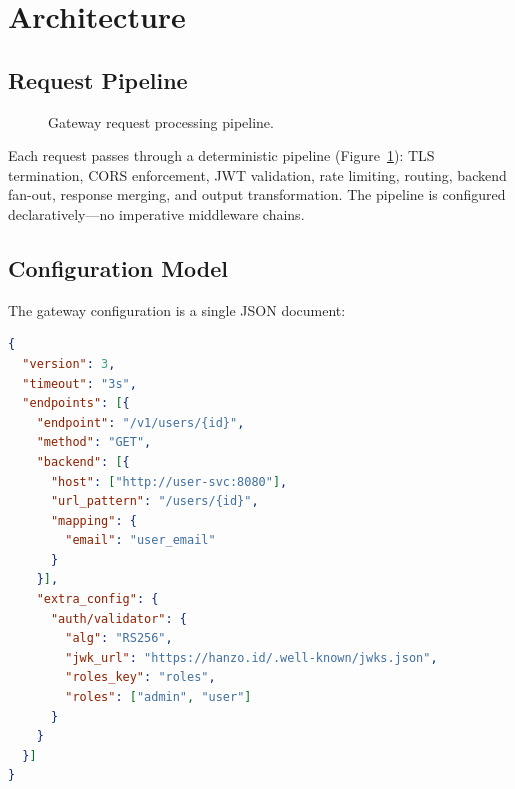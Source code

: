 \documentclass[11pt,twocolumn]{article}
\begin{document}
\section{Architecture}

\subsection{Request Pipeline}

\begin{figure}[t]
\centering
{}
\caption{Gateway request processing pipeline.}
\label{fig:pipeline}
\end{figure}

Each request passes through a deterministic pipeline (Figure~\ref{fig:pipeline}): TLS termination, CORS enforcement, JWT validation, rate limiting, routing, backend fan-out, response merging, and output transformation. The pipeline is configured declaratively---no imperative middleware chains.

\subsection{Configuration Model}

The gateway configuration is a single JSON document:

\begin{lstlisting}[language=JSON]
{
  "version": 3,
  "timeout": "3s",
  "endpoints": [{
    "endpoint": "/v1/users/{id}",
    "method": "GET",
    "backend": [{
      "host": ["http://user-svc:8080"],
      "url_pattern": "/users/{id}",
      "mapping": {
        "email": "user_email"
      }
    }],
    "extra_config": {
      "auth/validator": {
        "alg": "RS256",
        "jwk_url": "https://hanzo.id/.well-known/jwks.json",
        "roles_key": "roles",
        "roles": ["admin", "user"]
      }
    }
  }]
}
\end{lstlisting}
\end{document}
